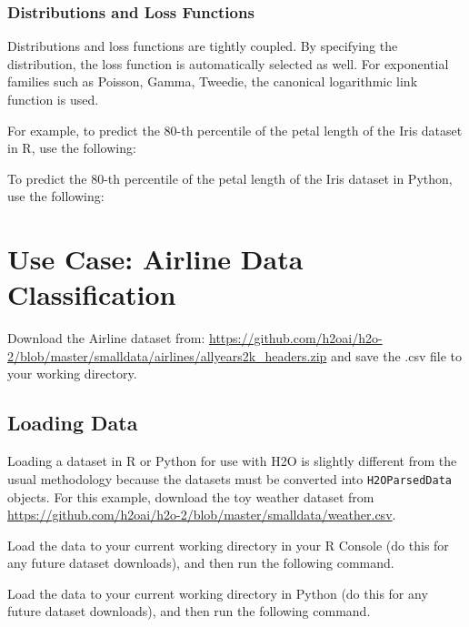 \subsubsection{Distributions and Loss Functions}
Distributions and loss functions are tightly coupled. By specifying the distribution, the loss function is automatically selected as well. For exponential families such as Poisson, Gamma, Tweedie, the canonical logarithmic link function is used.

For example, to predict the 80-th percentile of the petal length of the Iris dataset in R, use the following:

\waterExampleInR


To predict the 80-th percentile of the petal length of the Iris dataset in Python, use the following:

\waterExampleInPython




\section{Use Case: Airline Data Classification}
Download the Airline dataset from: {\url{https://github.com/h2oai/h2o-2/blob/master/smalldata/airlines/allyears2k_headers.zip}} and save the .csv file to your working directory. 

\subsection{Loading Data}

Loading a dataset in R or Python for use with H2O is slightly different from the usual methodology because the datasets must be converted into \texttt{H2OParsedData} objects. For this example, download the toy weather dataset from
{\url{https://github.com/h2oai/h2o-2/blob/master/smalldata/weather.csv}}.

Load the data to your current working directory in your R Console (do this for any future dataset downloads), and then run the following command.

\waterExampleInR


Load the data to your current working directory in Python (do this for any future dataset downloads), and then run the following command.

